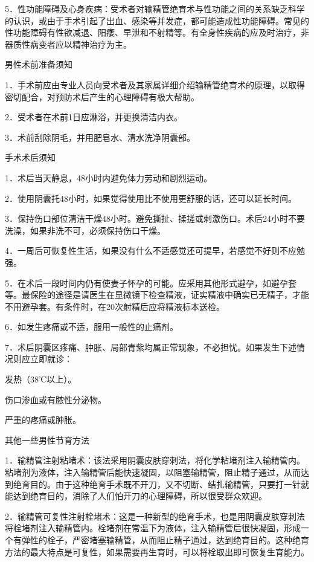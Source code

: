 \documentclass[12pt,UTF8,openany]{ctexbook}
\begin{document}
5．性功能障碍及心身疾病：受术者对输精管绝育术与性功能之间的关系缺乏科学的认识，或由于手术引起了出血、感染等并发症，都可能造成性功能障碍。常见的性功能障碍有性欲减退、阳痿、早泄和不射精等。有全身性疾病的应及时治疗，非器质性病变者应以精神治疗为主。





男性术前准备须知


1．手术前应由专业人员向受术者及其家属详细介绍输精管绝育术的原理，以取得密切配合，对预防术后产生的心理障碍有极大帮助。

2．受术者在术前1日应淋浴，并更换清洁内衣。

3．术前刮除阴毛，并用肥皂水、清水洗净阴囊部。





手术术后须知


1．术后当天静息，48小时内避免体力劳动和剧烈运动。

2．使用阴囊托48小时，如果觉得使用比不使用更舒服的话，还可以延长时间。

3．保持伤口部位清洁干燥48小时。避免撕扯、揉搓或刺激伤口。术后24小时不要洗澡，如果非洗不可，必须保持伤口干燥。

4．一周后可恢复性生活，如果没有什么不适感觉还可提早，若感觉不好则不应勉强。

5．在术后一段时间内仍有使妻子怀孕的可能。应采用其他形式避孕，如避孕套等。最保险的途径是请医生在显微镜下检查精液，证实精液中确实已无精子，才能不用避孕套。有条件时，在20次射精后应将精液标本送检。

6．如发生疼痛或不适，服用一般性的止痛剂。

7．术后阴囊区疼痛、肿胀、局部青紫均属正常现象，不必担忧。如果发生下述情况则应立即就诊：

发热（38℃以上）。

伤口渗血或有脓性分泌物。

严重的疼痛或肿胀。





其他一些男性节育方法


1．输精管注射粘堵术：该法采用阴囊皮肤穿刺法，将化学粘堵剂注入输精管内。粘堵剂为液体，注入输精管后能快速凝固，以阻塞输精管，阻止精子通过，从而达到绝育目的。由于这种绝育手术既不开刀，又不切断、结扎输精管，只要打一针就能达到绝育目的，消除了人们怕开刀的心理障碍，所以很受群众欢迎。

2．输精管可复性注射栓堵术：这是一种新型的绝育手术，也是用阴囊皮肤穿刺法将栓堵剂注入输精管内。栓堵剂在常温下为液体，注入输精管后很快凝固，形成一个有弹性的栓子，严密堵塞输精管，从而阻止精子通过，达到绝育目的。这种绝育方法的最大特点是可复性，如果需要再生育时，可以将栓取出即可恢复生育能力。
\end{document}
